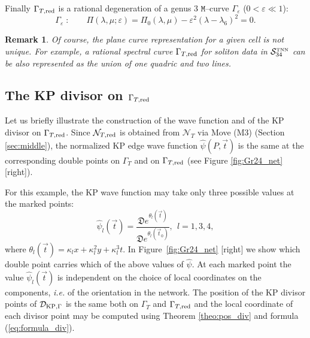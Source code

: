 \documentclass[11pt]{amsart}
\theoremstyle{plain}
\numberwithin{equation}{section}
\newtheorem{remark}{Remark}[subsection]
\def \DKP {{\mathcal D}_{\textup{\scriptsize KP},\Gamma}}
\begin{document}
Finally $\Gamma_{T,\mbox{\scriptsize red}}$ is a rational degeneration of a genus 3 $\mathtt M$--curve $\Gamma_{\varepsilon}$ ($0<\varepsilon \ll 1$):
\begin{equation}
\label{eq:curveGr24_pert}
\Gamma_{\varepsilon} \; : \quad\quad \Pi(\lambda, \mu;\varepsilon)=  \Pi_0(\lambda,\mu)-\varepsilon^2\left(\lambda -\lambda_6\right)^2=0.
\end{equation}

\begin{remark}
Of course, the plane curve representation for a given cell is not unique. For example, a rational spectral curve $\Gamma_{T,\mbox{\scriptsize red}}$ for soliton data in ${\mathcal S}_{34}^{\mbox{\tiny TNN}}$ can be also represented as the union of one quadric and two lines. 
\end{remark}

\subsection{The KP divisor on $\Gamma_{T,\mbox{\scriptsize red}}$}\label{sec:div_24}

Let us briefly illustrate the construction of the wave function and of the KP divisor on $\Gamma_{T,\mbox{\scriptsize red}}$. 
Since ${\mathcal N}_{T,{\mbox{\scriptsize red}}}$ is obtained from ${\mathcal N}_T$ via Move (M3) (Section \ref{sec:middle}),
the normalized KP edge wave function $\hat \psi (P, \vec t)$ is the same at the corresponding double points on $\Gamma_T$ and on $\Gamma_{T,\mbox{\scriptsize red}}$ (see Figure \ref{fig:Gr24_net} [right]). 

For this example, the KP wave function  may take only three possible values at the marked points:
\begin{equation}
\label{eq:hat_psi}
\hat \psi_l (\vec t) = \frac{{\mathfrak D} e^{\theta_l(\vec t)}}{{\mathfrak D} e^{\theta_l(\vec t_0)}}, \ \ l=1,3,4,
\end{equation}
where $\theta_l(\vec t) = \kappa_l x+  \kappa_l^2 y+ \kappa_l^3 t$. In Figure~\ref{fig:Gr24_net} [right] we show which double point carries which of the above values of $\hat \psi$. At each marked point the value $\hat \psi_l (\vec t)$ is independent on the choice of local coordinates on the components, {\sl i.e.} of the orientation in the network. 
The position of the KP divisor points of $\DKP$ is the same both on $\Gamma_T$ and $\Gamma_{T,\mbox{\scriptsize red}}$ and the local coordinate of each divisor point may be computed using Theorem \ref{theo:pos_div} and formula (\ref{eq:formula_div}). 
\end{document}
